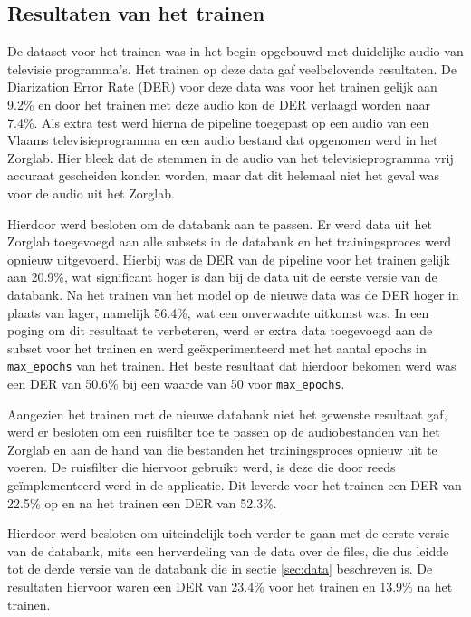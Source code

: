 \subsection{Resultaten van het trainen}
\label{subsec:train-res}

De dataset voor het trainen was in het begin opgebouwd met duidelijke audio van televisie programma's. Het trainen op deze data gaf veelbelovende resultaten. De Diarization Error Rate (DER) voor deze data was voor het trainen gelijk aan 9.2\% en door het trainen met deze audio kon de DER verlaagd worden naar 7.4\%. Als extra test werd hierna de pipeline toegepast op een audio van een Vlaams televisieprogramma en een audio bestand dat opgenomen werd in het Zorglab. Hier bleek dat de stemmen in de audio van het televisieprogramma vrij accuraat gescheiden konden worden, maar dat dit helemaal niet het geval was voor de audio uit het Zorglab.

Hierdoor werd besloten om de databank aan te passen. Er werd data uit het Zorglab toegevoegd aan alle subsets in de databank en het trainingsproces werd opnieuw uitgevoerd. Hierbij was de DER van de pipeline voor het trainen gelijk aan 20.9\%, wat significant hoger is dan bij de data uit de eerste versie van de databank. Na het trainen van het model op de nieuwe data was de DER hoger in plaats van lager, namelijk 56.4\%, wat een onverwachte uitkomst was. In een poging om dit resultaat te verbeteren, werd er extra data toegevoegd aan de subset voor het trainen en werd geëxperimenteerd met het aantal epochs in \lstinline{max_epochs} van het trainen. Het beste resultaat dat hierdoor bekomen werd was een DER van 50.6\% bij een waarde van 50 voor \lstinline{max_epochs}.

Aangezien het trainen met de nieuwe databank niet het gewenste resultaat gaf, werd er besloten om een ruisfilter toe te passen op de audiobestanden van het Zorglab en aan de hand van die bestanden het trainingsproces opnieuw uit te voeren. De ruisfilter die hiervoor gebruikt werd, is deze die door \textcite{Daems2023} reeds geïmplementeerd werd in de applicatie. Dit leverde voor het trainen een DER van 22.5\% op en na het trainen een DER van 52.3\%.

Hierdoor werd besloten om uiteindelijk toch verder te gaan met de eerste versie van de databank, mits een herverdeling van de data over de files, die dus leidde tot de derde versie van de databank die in sectie \ref{sec:data} beschreven is. De resultaten hiervoor waren een DER van 23.4\% voor het trainen en 13.9\% na het trainen.

